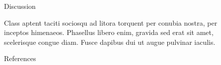 \documentclass[final]{beamer}
\newlength{\sepwidth}
\newlength{\colwidth}
\newcommand{\separatorcolumn}{\begin{column}{\sepwidth}\end{column}}
\begin{document}
\begin{frame}[t]
\begin{columns}[t]
\begin{column}{\colwidth}
  \begin{block}{Discussion}

    Class aptent taciti sociosqu ad litora torquent per conubia nostra, per
    inceptos himenaeos. Phasellus libero enim, gravida sed erat sit amet,
    scelerisque congue diam. Fusce dapibus dui ut augue pulvinar iaculis.

  \end{block}

  \begin{block}{References}

    \nocite{*}
    \footnotesize{}

  \end{block}

\end{column}

\separatorcolumn
\end{columns}
\end{frame}
\end{document}
